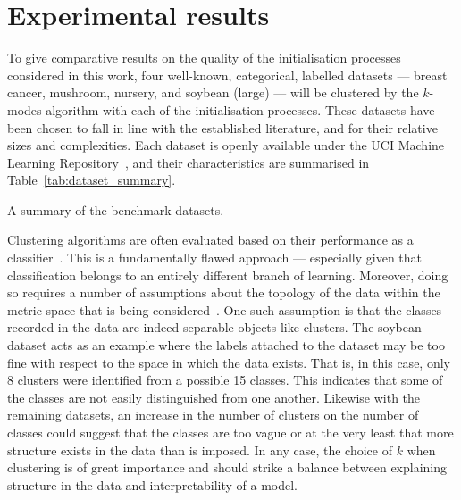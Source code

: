 \section{Experimental results}\label{sec:results}

To give comparative results on the quality of the initialisation processes
considered in this work, four well-known, categorical, labelled datasets ---
breast cancer, mushroom, nursery, and soybean (large) --- will be clustered by
the \(k\)-modes algorithm with each of the initialisation processes. These
datasets have been chosen to fall in line with the established literature, and
for their relative sizes and complexities. Each dataset is openly available
under the UCI Machine Learning Repository~\cite{Dua2019}, and their
characteristics are summarised in Table~\ref{tab:dataset_summary}.

\begin{table}[htbp]
    \resizebox{\textwidth}{!}{%
        
    }\caption{A summary of the benchmark datasets.}\label{tab:dataset_summary}
\end{table}

Clustering algorithms are often evaluated based on their performance as a
classifier~\cite{%
    Arthur2007,Cao2009,Cao2012,Huang1998,Ng2007,Olaode2014,Schaeffer2007%
}. This is a fundamentally flawed approach --- especially given that
classification belongs to an entirely different branch of learning.  Moreover,
doing so requires a number of assumptions about the topology of the data within
the metric space that is being considered~\cite{Memoli2011}.  One such
assumption is that the classes recorded in the data are indeed separable objects
like clusters. The soybean dataset acts as an example where the labels attached
to the dataset may be too fine with respect to the space in which the data
exists. That is, in this case, only 8 clusters were identified from a possible
15 classes. This indicates that some of the classes are not easily distinguished
from one another. Likewise with the remaining datasets, an increase in the
number of clusters on the number of classes could suggest that the classes are
too vague or at the very least that more structure exists in the data than is
imposed. In any case, the choice of \(k\) when clustering is of great importance
and should strike a balance between explaining structure in the data and
interpretability of a model.

